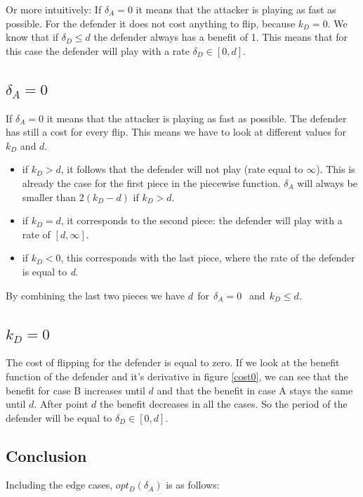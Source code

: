 Or more intuitively: If $\delta_{A}=0$ it means that the attacker is playing as fast as possible. For the defender it does not cost anything to flip, because $k_{D}=0$. We know that if $\delta_{D} \leq d$ the defender always has a benefit of 1. This means that for this case the defender will play with a rate $\delta_{D} \in [0,d]$.\\
\subsection*{$\delta_{A}=0$}
If $\delta_{A}=0$ it means that the attacker is playing as fast as possible. The defender has still a cost for every flip. This means we have to look at different values for $k_{D}$ and $d$.
\begin{itemize}
\item if $k_{D} > d$, it follows that the defender will not play (rate equal to $\infty$). This is already the case for the first piece in the piecewise function. $\delta_{A}$ will always be smaller than $2(k_{D}-d)$ if $k_{D} > d.$
\item if $k_{D}=d$, it corresponds to the second piece: the defender will play with a rate of $[d,\infty]$.
\item if $k_{D} < 0$, this corresponds with the last piece, where the rate of the defender is equal to \textit{d}.
\end{itemize}
By combining the last two pieces we have  $d ~~$for$~~ \delta_{A} =0 ~~$ and$ ~~k_{D} \leq d$.\\

\subsection*{$k_{D}=0$}
The cost of flipping for the defender is equal to zero. If we look at the benefit function of the defender and it's derivative in figure \ref{cost0}, we can see that the benefit for case B increases until $d$ and that the benefit in case A stays the same until $d$. After point $d$ the benefit decreases in all the cases. So the period of the defender will be equal to $\delta_{D} \in [0,d]$.






\subsection{Conclusion}
Including the edge cases, $opt_{D}(\delta_{A})$ is as follows:  \\

